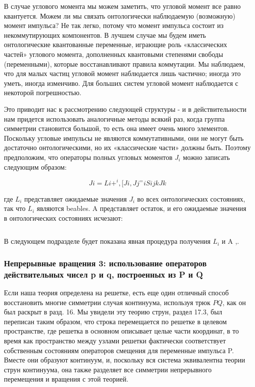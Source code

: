 \documentclass[main.tex]{subfiles}
\begin{document}
В случае углового момента мы можем заметить, что угловой момент все равно квантуется. Можем ли мы связать онтологически наблюдаемую (возможную) момент импульса? Не так легко, потому что момент импульса состоит из некоммутирующих компонентов. В лучшем случае мы будем иметь онтологические квантованные переменные, играющие роль «классических частей» углового момента, дополненных квантовыми степенями свободы (переменными), которые восстанавливают правила коммутации. Мы наблюдаем, что для малых частиц угловой момент наблюдается лишь частично; иногда это уметь, иногда изменчиво. Для больших систем угловой момент наблюдается с некоторой погрешностью.

Это приводит нас к рассмотрению следующей структуры - и в действительности нам придется использовать аналогичные методы всякий раз, когда группа симметрии становится большой, то есть она имеет очень много элементов. Поскольку угловые импульсы не являются коммутативными, они не могут быть достаточно онтологическими, но их «классические части» должны быть. Поэтому предположим, что операторы полных угловых моментов $J_i$ можно записать следующим образом:


\begin{equation}\label{18.20}
	Ji = Li + ^ i, [Ji, Jj ^ = iSijkJk
\end{equation}

где $L_i$ представляет ожидаемые значения $J_i$ во всех онтологических состояниях, так что $L_i$ являются beables. A представляет остаток, и его ожидаемые значения в онтологических состояниях исчезают:

\begin{equation}\label{18.21}
	
\end{equation}

В следующем подразделе будет показана явная процедура получения $L_i$ и A ,.

\subsubsection{Непрерывные вращения 3: использование операторов действительных чисел p и q, построенных из P и Q}\label{ch18.2.4}

Если наша теория определена на решетке, есть еще один отличный способ восстановить многие симметрии случая континуума, используя трюк $PQ$, как он был раскрыт в разд. 16. Мы увидели эту теорию струн, раздел 17.3, был переписан таким образом, что строка перемещается по решетке в целевом пространстве, где решетка в основном описывает целые части координат, в то время как пространство между узлами решетки фактически соответствует собственным состояниям операторов смещения для переменные импульса P. Вместе они образуют континуум, и, поскольку вся система эквивалентна теории струн континуума, она также разделяет все симметрии непрерывного перемещения и вращения с этой теорией.
\end{document}
